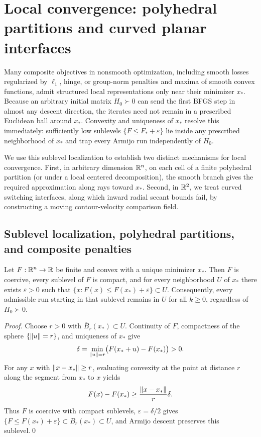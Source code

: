 \section{Local convergence: polyhedral partitions and curved planar interfaces}\label{art:local}\label{art:positive}

Many composite objectives in nonsmooth optimization, including smooth losses
regularized by $\ell_1$, hinge, or group-norm penalties and maxima of smooth
convex functions, admit structured local representations only near their
minimizer $x_*$. Because an arbitrary initial matrix $H_0\succ0$ can send the first BFGS step in
almost any descent direction, the iterates need not remain in a prescribed
Euclidean ball around $x_*$. Convexity and uniqueness of $x_*$ resolve
this immediately: sufficiently low sublevels $\{F\le F_*+\varepsilon\}$ lie
inside any prescribed neighborhood of $x_*$ and trap every Armijo run
independently of $H_0$.

We use this sublevel localization to establish two distinct mechanisms for local
convergence. First, in arbitrary dimension $\mathbb R^n$, on each cell of a finite
polyhedral partition (or under a local centered decomposition), the smooth
branch gives the required approximation along rays toward $x_*$. Second, in
$\mathbb R^2$, we treat curved switching interfaces, along which inward radial secant
bounds fail, by constructing a moving contour-velocity comparison field.

\subsection{Sublevel localization, polyhedral partitions, and composite penalties}

\begin{lemma}\label{art:localization}
Let $F:\mathbb R^n\to\mathbb R$ be finite and convex with a unique minimizer $x_*$. Then $F$
is coercive, every sublevel of $F$ is compact, and for every neighborhood $U$
of $x_*$ there exists $\varepsilon>0$ such that
$\{x:F(x)\le F(x_*)+\varepsilon\}\subset U$. Consequently, every admissible run
starting in that sublevel remains in $U$ for all $k\ge0$, regardless of
$H_0\succ0$.
\end{lemma}
\begin{proof}
Choose $r>0$ with $\overline B_r(x_*)\subset U$. Continuity of $F$, compactness
of the sphere $\{\lVert u\rVert=r\}$, and uniqueness of $x_*$ give
\[
 \delta=\min_{\lVert u\rVert=r}\bigl(F(x_*+u)-F(x_*)\bigr)>0.
\]
For any $x$ with $\lVert x-x_*\rVert\ge r$, evaluating convexity at the point at
distance $r$ along the segment from $x_*$ to $x$ yields
\[
 F(x)-F(x_*)\ge\frac{\lVert x-x_*\rVert}r\delta.
\]
Thus $F$ is coercive with compact sublevels, $\varepsilon=\delta/2$ gives
$\{F\le F(x_*)+\varepsilon\}\subset B_r(x_*)\subset U$, and Armijo descent
preserves this sublevel.\qed
\end{proof}

